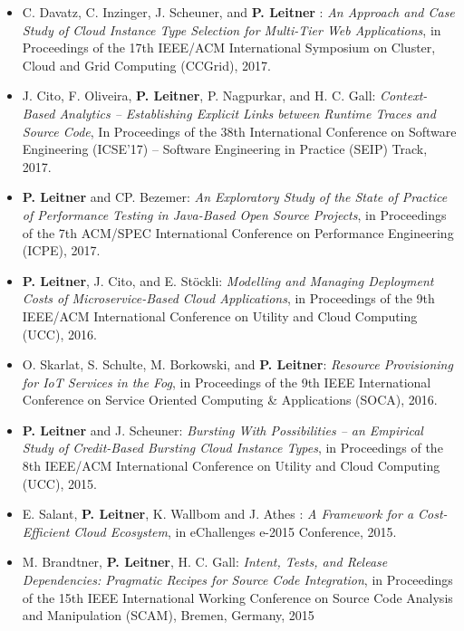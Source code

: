 \documentclass[paper=letter,fontsize=11pt]{scrartcl} %
\begin{document}
\begin{itemize}
	\item C. Davatz, C. Inzinger, J. Scheuner, and \textbf{P. Leitner} : \emph{An Approach and Case Study of Cloud Instance Type Selection for Multi-Tier Web Applications}, in Proceedings of the 17th IEEE/ACM International Symposium on Cluster, Cloud and Grid Computing (CCGrid), 2017.
	\item J. Cito, F. Oliveira, \textbf{P. Leitner}, P. Nagpurkar, and H. C. Gall: \emph{Context-Based Analytics – Establishing Explicit Links between Runtime Traces and Source Code}, In Proceedings of the 38th International Conference on Software Engineering (ICSE'17) -- Software Engineering in Practice (SEIP) Track, 2017.
        \item \textbf{P. Leitner} and CP. Bezemer: \emph{An Exploratory Study of the State of Practice of Performance Testing in Java-Based Open Source Projects}, in  Proceedings of the 7th ACM/SPEC International Conference on Performance Engineering (ICPE), 2017.
	\item \textbf{P. Leitner}, J. Cito, and E. St\"ockli: \emph{Modelling and Managing Deployment Costs of Microservice-Based Cloud Applications}, in Proceedings of the 9th IEEE/ACM International Conference on Utility and Cloud Computing (UCC), 2016.
  \item O. Skarlat, S. Schulte, M. Borkowski, and \textbf{P. Leitner}: \emph{Resource Provisioning for IoT Services in the Fog}, in Proceedings of the 9th IEEE International Conference on Service Oriented Computing \& Applications (SOCA), 2016.
	\item \textbf{P. Leitner} and J. Scheuner: \emph{Bursting With Possibilities -- an Empirical Study of Credit-Based Bursting Cloud Instance Types}, in Proceedings of the 8th IEEE/ACM International Conference on Utility and Cloud Computing (UCC), 2015.
  \item E. Salant, \textbf{P. Leitner}, K. Wallbom and J. Athes : \emph{A Framework for a Cost-Efficient Cloud Ecosystem}, in eChallenges e-2015 Conference, 2015.
  \item M. Brandtner, \textbf{P. Leitner}, H. C. Gall: \emph{Intent, Tests, and Release Dependencies: Pragmatic Recipes for Source Code Integration}, in Proceedings of the 15th IEEE International Working Conference on Source Code Analysis and Manipulation (SCAM), Bremen, Germany, 2015

\end{itemize}
\end{document}
